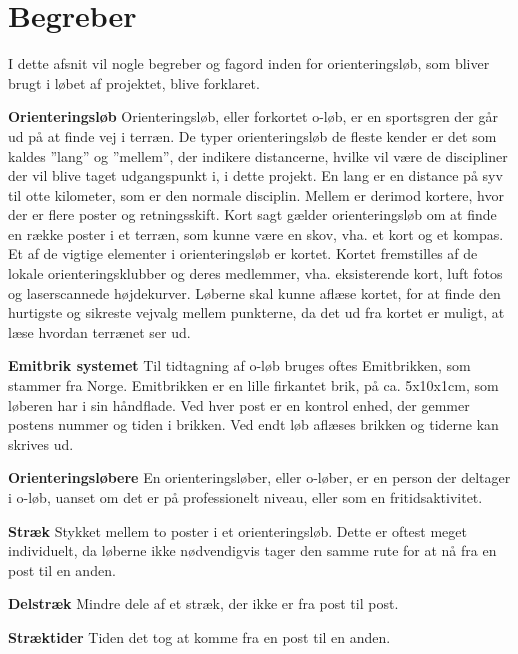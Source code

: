 \newpage
\section{Begreber}
I dette afsnit vil nogle begreber og fagord inden for orienteringsløb, som bliver brugt i løbet af projektet, blive forklaret.

\textbf{Orienteringsløb}\newline
Orienteringsløb, eller forkortet o-løb, er en sportsgren der går ud på at finde vej i terræn. \newline
De typer orienteringsløb de fleste kender er det som kaldes ”lang” og ”mellem”, der indikere distancerne, hvilke vil være de discipliner der vil blive taget udgangspunkt i, i dette projekt.\newline
En lang er en distance på syv til otte kilometer, som er den normale disciplin. Mellem er derimod kortere, hvor der er flere poster og retningsskift.\newline
Kort sagt gælder orienteringsløb om at finde en række poster i et terræn, som kunne være en skov, vha. et kort og et kompas. Et af de vigtige elementer i orienteringsløb er kortet. Kortet fremstilles af de lokale orienteringsklubber og deres medlemmer, vha. eksisterende kort, luft fotos og laserscannede højdekurver. Løberne skal kunne aflæse kortet, for at finde den hurtigste og sikreste vejvalg mellem punkterne, da det ud fra kortet er muligt, at læse hvordan terrænet ser ud. \citep{DOF}   

\textbf{Emitbrik systemet}\newline
Til tidtagning af o-løb bruges oftes Emitbrikken, som stammer fra Norge. Emitbrikken er en lille firkantet brik, på ca. 5x10x1cm, som løberen har i sin håndflade. Ved hver post er en kontrol enhed, der gemmer postens nummer og tiden i brikken. Ved endt løb aflæses brikken og tiderne kan skrives ud. 

\textbf{Orienteringsløbere}\newline
En orienteringsløber, eller o-løber, er en person der deltager i o-løb, uanset om det er på professionelt niveau, eller som en fritidsaktivitet.

\textbf{Stræk}\newline
Stykket mellem to poster i et orienteringsløb. Dette er oftest meget individuelt, da løberne ikke nødvendigvis tager den samme rute for at nå fra en post til en anden.

\textbf{Delstræk}\newline
Mindre dele af et stræk, der ikke er fra post til post. 

\textbf{Stræktider}\newline
Tiden det tog at komme fra en post til en anden.\newline

